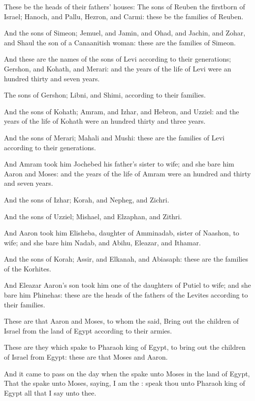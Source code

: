 \Verse These be the heads of their fathers' houses: The sons of Reuben the firstborn of Israel; Hanoch, and Pallu, Hezron, and Carmi: these be the families of Reuben.

\Verse And the sons of Simeon; Jemuel, and Jamin, and Ohad, and Jachin, and Zohar, and Shaul the son of a Canaanitish woman: these are the families of Simeon.

\Verse And these are the names of the sons of Levi according to their generations; Gershon, and Kohath, and Merari: and the years of the life of Levi were an hundred thirty and seven years.

\Verse The sons of Gershon; Libni, and Shimi, according to their families.

\Verse And the sons of Kohath; Amram, and Izhar, and Hebron, and Uzziel: and the years of the life of Kohath were an hundred thirty and three years.

\Verse And the sons of Merari; Mahali and Mushi: these are the families of Levi according to their generations.

\Verse And Amram took him Jochebed his father's sister to wife; and she bare him Aaron and Moses: and the years of the life of Amram were an hundred and thirty and seven years.

\Verse And the sons of Izhar; Korah, and Nepheg, and Zichri.

\Verse And the sons of Uzziel; Mishael, and Elzaphan, and Zithri.

\Verse And Aaron took him Elisheba, daughter of Amminadab, sister of Naashon, to wife; and she bare him Nadab, and Abihu, Eleazar, and Ithamar.

\Verse And the sons of Korah; Assir, and Elkanah, and Abiasaph: these are the families of the Korhites.

\Verse And Eleazar Aaron's son took him one of the daughters of Putiel to wife; and she bare him Phinehas: these are the heads of the fathers of the Levites according to their families.

\Verse These are that Aaron and Moses, to whom the \LORD said, Bring out the children of Israel from the land of Egypt according to their armies.

\Verse These are they which spake to Pharaoh king of Egypt, to bring out the children of Israel from Egypt: these are that Moses and Aaron.

\Verse And it came to pass on the day when the \LORD spake unto Moses in the land of Egypt, \Verse That the \LORD spake unto Moses, saying, I am the \LORD: speak thou unto Pharaoh king of Egypt all that I say unto thee.

